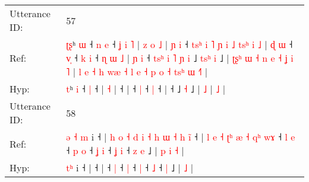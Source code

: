\documentclass[10pt]{article}
\DeclareRobustCommand{\hl}[1]{{\textcolor{red}{#1}}}
\begin{document}
\begin{longtable}{ll}
 \\
\midrule
Utterance ID: & 57 \\
Ref: & \hl{ʈ}\hl{ʂ}ʰ \hl{ɯ} ˧\hl{ }\hl{n} \hl{e} ˧\hl{ }\hl{ʝ}\hl{ }\hl{i}\hl{ }\hl{˥} |\hl{ }\hl{z}\hl{ }\hl{o} \hl{˩} |\hl{ }\hl{ɲ}\hl{ }\hl{i} ˧\hl{ }\hl{t}\hl{s}\hl{ʰ}\hl{ }\hl{i}\hl{ }\hl{˥}\hl{ }\hl{ɲ}\hl{ }\hl{i}\hl{ }\hl{˩}\hl{ }\hl{t}\hl{s}\hl{ʰ}\hl{ }\hl{i}\hl{ }\hl{˩} |\hl{ }\hl{ɖ}\hl{ }\hl{ɯ} ˧ \hl{v}\hl{̩} ˧\hl{ }\hl{k} \hl{i} ˧\hl{ }\hl{ɳ}\hl{ }\hl{ɯ}\hl{ }\hl{˩} |\hl{ }\hl{ɲ}\hl{ }\hl{i} ˧\hl{ }\hl{t}\hl{s}\hl{ʰ}\hl{ }\hl{i}\hl{ }\hl{˥}\hl{ }\hl{ɲ}\hl{ }\hl{i} ˩\hl{ }\hl{t}\hl{s}\hl{ʰ} \hl{i} ˩ |\hl{ }\hl{ʈ}\hl{ʂ}\hl{ʰ}\hl{ }\hl{ɯ}\hl{ }\hl{˧}\hl{ }\hl{n}\hl{ }\hl{e}\hl{ }\hl{˧}\hl{ }\hl{ʝ}\hl{ }\hl{i} \hl{˥} |\hl{ }\hl{l}\hl{ }\hl{e}\hl{ }\hl{˧}\hl{ }\hl{h}\hl{ }\hl{w}\hl{æ}\hl{ }\hl{˧}\hl{ }\hl{l}\hl{ }\hl{e}\hl{ }\hl{˧}\hl{ }\hl{p}\hl{ }\hl{o}\hl{ }\hl{˧}\hl{ }\hl{t}\hl{s}\hl{ʰ}\hl{ }\hl{ɯ} \hl{˧}\hl{˥} |
 \\
Hyp: & \hl{}\hl{t}ʰ \hl{i} ˧\hl{}\hl{} \hl{|} ˧\hl{}\hl{}\hl{}\hl{}\hl{}\hl{} |\hl{}\hl{}\hl{}\hl{} \hl{˧} |\hl{}\hl{}\hl{}\hl{} ˧\hl{}\hl{}\hl{}\hl{}\hl{}\hl{}\hl{}\hl{}\hl{}\hl{}\hl{}\hl{}\hl{}\hl{}\hl{}\hl{}\hl{}\hl{}\hl{}\hl{}\hl{}\hl{} |\hl{}\hl{}\hl{}\hl{} ˧ \hl{}\hl{|} ˧\hl{}\hl{} \hl{|} ˧\hl{}\hl{}\hl{}\hl{}\hl{}\hl{} |\hl{}\hl{}\hl{}\hl{} ˧\hl{}\hl{}\hl{}\hl{}\hl{}\hl{}\hl{}\hl{}\hl{}\hl{}\hl{}\hl{} ˩\hl{}\hl{}\hl{}\hl{} \hl{˧} ˩ |\hl{}\hl{}\hl{}\hl{}\hl{}\hl{}\hl{}\hl{}\hl{}\hl{}\hl{}\hl{}\hl{}\hl{}\hl{}\hl{}\hl{}\hl{} \hl{˩} |\hl{}\hl{}\hl{}\hl{}\hl{}\hl{}\hl{}\hl{}\hl{}\hl{}\hl{}\hl{}\hl{}\hl{}\hl{}\hl{}\hl{}\hl{}\hl{}\hl{}\hl{}\hl{}\hl{}\hl{}\hl{}\hl{}\hl{}\hl{}\hl{}\hl{}\hl{} \hl{}\hl{˩} |
 \\
\midrule
Utterance ID: & 58 \\
Ref: & \hl{ə}\hl{ }\hl{˧}\hl{ }\hl{m} i ˧ |\hl{ }\hl{h}\hl{ }\hl{o}\hl{ }\hl{˧}\hl{ }\hl{d}\hl{ }\hl{i}\hl{ }\hl{˧}\hl{ }\hl{h}\hl{ }\hl{ɯ}\hl{ }\hl{˧}\hl{ }\hl{h}\hl{ }\hl{i}\hl{̃} ˧ |\hl{ }\hl{l}\hl{ }\hl{e}\hl{ }\hl{˧}\hl{ }\hl{ʈ}\hl{ʰ}\hl{ }\hl{æ}\hl{ }\hl{˧}\hl{ }\hl{q}\hl{ʰ}\hl{ }\hl{w}\hl{ɤ} ˧\hl{ }\hl{l} \hl{e} ˧\hl{ }\hl{p} \hl{o} ˧\hl{ }\hl{ʝ} \hl{i} ˧\hl{ }\hl{ʝ} \hl{i} ˧\hl{ }\hl{z} \hl{e} ˩ |\hl{ }\hl{p}\hl{ }\hl{i} \hl{˧} |
 \\
Hyp: & \hl{}\hl{}\hl{}\hl{t}\hl{ʰ} i ˧ |\hl{}\hl{}\hl{}\hl{}\hl{}\hl{}\hl{}\hl{}\hl{}\hl{}\hl{}\hl{}\hl{}\hl{}\hl{}\hl{}\hl{}\hl{}\hl{}\hl{}\hl{}\hl{}\hl{} ˧ |\hl{}\hl{}\hl{}\hl{}\hl{}\hl{}\hl{}\hl{}\hl{}\hl{}\hl{}\hl{}\hl{}\hl{}\hl{}\hl{}\hl{}\hl{}\hl{} ˧\hl{}\hl{} \hl{|} ˧\hl{}\hl{} \hl{|} ˧\hl{}\hl{} \hl{|} ˧\hl{}\hl{} \hl{˩} ˧\hl{}\hl{} \hl{|} ˩ |\hl{}\hl{}\hl{}\hl{} \hl{˩} |

\end{longtable}
\end{document}
